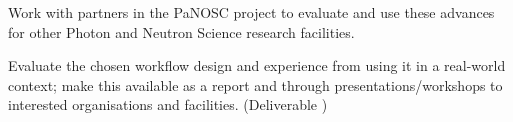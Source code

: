 \begin{task}[
  title=Reproducible X-ray crystallography workflows at European XFEL,
  id=reproducibility-xfel,
  lead=XFEL,
  PM=36,
  wphases={6-48},
  partners={XFEL}
  ]
\begin{compactitem}
  \item Work with partners in the PaNOSC project to evaluate and use
    these advances for other Photon and Neutron Science research
    facilities.

  \item Evaluate the chosen workflow design and experience from using
    it in a real-world context; make this available as a report and
    through presentations/workshops to interested organisations and
    facilities. (Deliverable )
  \end{compactitem}

  \end{task}
